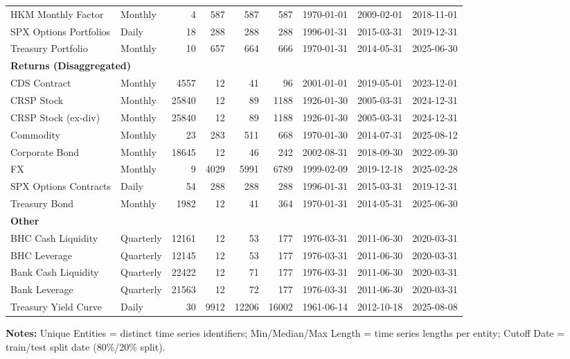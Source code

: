 \begin{table}[htbp]
\begin{tabular}{@{}llrrrrlll@{}}
HKM Monthly Factor & Monthly & 4 & 587 & 587 & 587 & 1970-01-01 & 2009-02-01 & 2018-11-01 \\
SPX Options Portfolios & Daily & 18 & 288 & 288 & 288 & 1996-01-31 & 2015-03-31 & 2019-12-31 \\
Treasury Portfolio & Monthly & 10 & 657 & 664 & 666 & 1970-01-31 & 2014-05-31 & 2025-06-30 \\
\midrule
\multicolumn{9}{l}{\textbf{Returns (Disaggregated)}} \\
CDS Contract & Monthly & 4557 & 12 & 41 & 96 & 2001-01-01 & 2019-05-01 & 2023-12-01 \\
CRSP Stock & Monthly & 25840 & 12 & 89 & 1188 & 1926-01-30 & 2005-03-31 & 2024-12-31 \\
CRSP Stock (ex-div) & Monthly & 25840 & 12 & 89 & 1188 & 1926-01-30 & 2005-03-31 & 2024-12-31 \\
Commodity & Monthly & 23 & 283 & 511 & 668 & 1970-01-30 & 2014-07-31 & 2025-08-12 \\
Corporate Bond & Monthly & 18645 & 12 & 46 & 242 & 2002-08-31 & 2018-09-30 & 2022-09-30 \\
FX & Monthly & 9 & 4029 & 5991 & 6789 & 1999-02-09 & 2019-12-18 & 2025-02-28 \\
SPX Options Contracts & Daily & 54 & 288 & 288 & 288 & 1996-01-31 & 2015-03-31 & 2019-12-31 \\
Treasury Bond & Monthly & 1982 & 12 & 41 & 364 & 1970-01-31 & 2014-05-31 & 2025-06-30 \\
\midrule
\multicolumn{9}{l}{\textbf{Other}} \\
BHC Cash Liquidity & Quarterly & 12161 & 12 & 53 & 177 & 1976-03-31 & 2011-06-30 & 2020-03-31 \\
BHC Leverage & Quarterly & 12145 & 12 & 53 & 177 & 1976-03-31 & 2011-06-30 & 2020-03-31 \\
Bank Cash Liquidity & Quarterly & 22422 & 12 & 71 & 177 & 1976-03-31 & 2011-06-30 & 2020-03-31 \\
Bank Leverage & Quarterly & 21563 & 12 & 72 & 177 & 1976-03-31 & 2011-06-30 & 2020-03-31 \\
Treasury Yield Curve & Daily & 30 & 9912 & 12206 & 16002 & 1961-06-14 & 2012-10-18 & 2025-08-08 \\
\bottomrule
\end{tabular}
\vspace{0.1cm}
\begin{minipage}{\textwidth}
\scriptsize
\textbf{Notes:} Unique Entities = distinct time series identifiers; Min/Median/Max Length = time series lengths per entity; Cutoff Date = train/test split date (80\%/20\% split).
\end{minipage}
\end{table}
